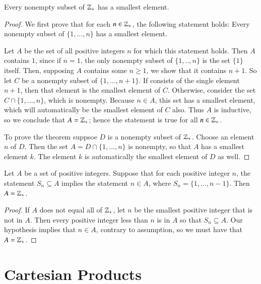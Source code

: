     \begin{theorem}
        Every nonempty subset of $\mathbb Z_+$ has a smallest element.
    \end{theorem}
    \begin{proof}
        We first prove that for each $n \in \mathbb Z_+$, the following statement holds: Every nonempty subset of $\{1,...,n\}$ has a smallest element.

        Let $A$ be the set of all positive integers $n$ for which this statement holds. Then $A$ contains $1$, since if $n = 1$, the only nonempty subset of $\{1,..,n\}$ is the set $\{1\}$ itself. Then, supposing $A$ contains some $n \geq 1$, we show that it contains $n+1$. So let $C$ be a nonempty subset of $\{1,...,n+1\}$. If consists of the single element $n+1$, then that element is the smallest element of $C$. Otherwise, consider the set $C\cap\{1,...,n\}$, which is nonempty. Because $n \in A$, this set has a smallest element, which will automatically be the smallest element of $C$ also. Thus $A$ is inductive, so we conclude that $A = \mathbb Z_+$; hence the statement is true for all $n \in \mathbb Z_+$.

        To prove the theorem suppsoe $D$ is a nonempty subset of $\mathbb Z_+$. Choose an element $n$ of $D$. Then the set $A = D\cap\{1,...,n\}$ is nonempty, so that $A$ has a smallest element $k$. The element $k$ is automatically the smallest element of $D$ as well.
    \end{proof}

    \begin{theorem}
        Let $A$ be a set of positive integers. Suppose that for each positive integer $n$, the statement $S_n \subseteq A$ implies the statement $n \in A$, where $S_n = \{1,...,n-1\}$. Then $A = \mathbb Z_+$.
    \end{theorem}
    \begin{proof}
        If $A$ does not equal all of $\mathbb Z_+$, let $n$ be the smallest positive integer that is not in $A$. Then every positive integer less than $n$ is in $A$ so that $S_n \subseteq A$. Our hypothesis implies that $n \in A$, contrary to assumption, so we must have that $A = \mathbb Z_+$.
    \end{proof}


    \section{Cartesian Products}

